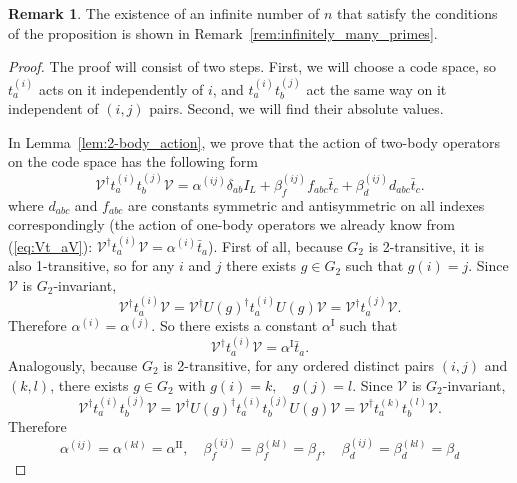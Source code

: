 \documentclass[10pt,twocolumn,superscriptaddress,aps,amsmath,amssymb,citeautoscript,floatfix,prx]{revtex4-2}
\theoremstyle{plain}
\theoremstyle{plain}
\theoremstyle{plain}
\theoremstyle{plain}
\theoremstyle{plain}
\theoremstyle{plain}
\theoremstyle{plain}
\theoremstyle{definition}
\newtheorem{smremark}[smtheorem]{Remark}
\theoremstyle{plain}
\begin{document}
\begin{appendix}
\begin{smremark}
    The existence of an infinite number of $n$ that satisfy the conditions of the proposition is shown in Remark~\ref{rem:infinitely_many_primes}.
\end{smremark}

\begin{proof}
The proof will consist of two steps. First, we will choose a code space, so $t_a^{(i)}$ acts on it independently of $i$, and $t_a^{(i)}t_b^{(j)}$ act the same way on it independent of $(i,j)$ pairs. Second, we will find their absolute values.


In Lemma~\ref{lem:2-body_action}, we prove that the action of two-body operators on the code space has the following form
\[
    \mathcal{V}^{\dagger} t_a^{(i)} t_b^{(j)} \mathcal{V}=\alpha^{(i j)} \delta_{a b} I_L+\beta^{(i j)}_{f} f_{a b c} \bar{t}_c +\beta^{(i j)}_{d} d_{a b c} \bar{t}_c .
\]
where $d_{a b c}$ and $f_{a b c}$ are constants symmetric and antisymmetric on all indexes correspondingly (the action of one-body operators we already know from (\ref{eq:Vt_aV}): $\mathcal{V}^{\dagger} t_a^{(i)} \mathcal{V}=\alpha^{(i)} \bar{t}_a$). 
First of all, because $G_2$ is 2-transitive, it is also 1-transitive, so for any $i$ and $j$ there exists $g \in G_2$ such that
$
    g(i)=j.
$
Since $\mathcal{V}$ is $G_2$-invariant,
\[
    \mathcal{V}^{\dagger} t_a^{(i)} \mathcal{V}=\mathcal{V}^{\dagger} U(g)^{\dagger} t_a^{(i)} U(g) \mathcal{V}=\mathcal{V}^{\dagger} t_a^{(j)} \mathcal{V} .
\]
Therefore
$
\alpha^{(i)}=\alpha^{(j)}.
$
So there exists a constant $\alpha^{\text{I}}$ such that
\[
\mathcal{V}^{\dagger} t_a^{(i)} \mathcal{V}=\alpha^{\text{I}} \bar{t}_a .
\]
Analogously, because $G_2$ is 2-transitive, for any ordered distinct pairs $(i, j)$ and $(k, l)$, there exists $g \in G_2$ with
$
g(i)=k, \quad g(j)=l .
$
Since $\mathcal{V}$ is $G_2$-invariant,
\[
\mathcal{V}^{\dagger} t_a^{(i)} t_b^{(j)} \mathcal{V}=\mathcal{V}^{\dagger} U(g)^{\dagger} t_a^{(i)} t_b^{(j)} U(g) \mathcal{V}=\mathcal{V}^{\dagger} t_a^{(k)} t_b^{(l)} \mathcal{V} .
\]
Therefore
$$
\alpha^{(i j)}=\alpha^{(k l)}=\alpha^{\text{II}}, \quad \beta^{(i j)}_{f}=\beta^{(k l)}_{f}=\beta_{f}, \quad \beta^{(i j)}_{d}=\beta^{(k l)}_{d}=\beta_{d}
$$


\end{proof}
\end{appendix}
\end{document}
